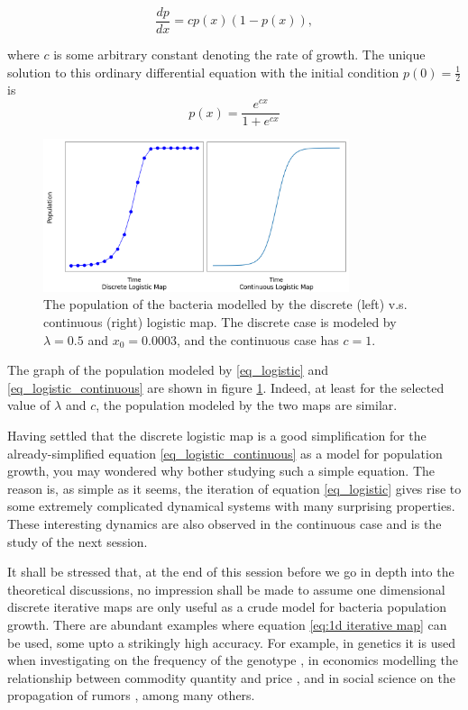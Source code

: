 \begin{equation}\label{eq_logistic_continuous}
	\frac{dp}{dx} = c p(x) (1-p(x)),
\end{equation}

where $c$ is some arbitrary constant denoting the rate of growth. 
The unique solution to this ordinary differential equation with the initial condition $p(0) = \frac{1}{2}$ is 
$$
p(x) = \frac{e^{cx}}{1+e^{cx}}
$$
\begin{figure}
	\centering
	\includegraphics[width=0.8\textwidth]{./figures/con_vs_discrete_logistic_map.png}
	\caption{The population of the bacteria modelled by the discrete (left) v.s. continuous (right) logistic map. 
	The discrete case is modeled by $\lambda = 0.5$ and $x_0 = 0.0003$, and the continuous case has $c=1$.}
	\label{fig:con_vs_discrete}
\end{figure}

The graph of the population modeled by \eqref{eq_logistic} and \eqref{eq_logistic_continuous} are shown in figure \ref{fig:con_vs_discrete}.
Indeed, at least for the selected value of $\lambda$ and $c$, the population modeled by the two maps are similar.

Having settled that the discrete logistic map is a good simplification for the already-simplified equation \ref{eq_logistic_continuous} as a model for population growth, you may wondered why bother studying such a simple equation. 
The reason is, as simple as it seems, the iteration of equation \ref{eq_logistic} gives rise to some extremely complicated dynamical systems with many surprising properties. 
These interesting dynamics are also observed in the continuous case and is the study of the next session.

It shall be stressed that, at the end of this session before we go in depth into the theoretical discussions, no impression shall be made to assume one dimensional discrete iterative maps are only useful as a crude model for bacteria population growth. 
There are abundant examples where equation \eqref{eq:1d iterative map} can be used, some upto a strikingly high accuracy. 
For example, in genetics it is used when investigating on the frequency of the genotype \cite{genotype}, in economics modelling the relationship between commodity quantity and price \cite{economics}, and in social science on the propagation of rumors \cite{social_science}, among many others.


